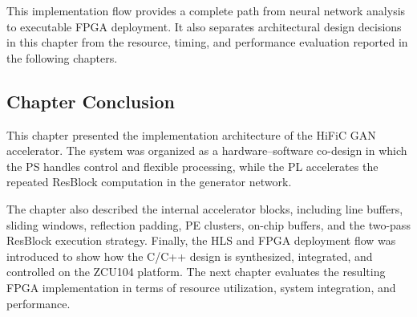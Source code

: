 This implementation flow provides a complete path from neural network analysis to executable FPGA deployment. It also separates architectural design decisions in this chapter from the resource, timing, and performance evaluation reported in the following chapters.

\subsection{Chapter Conclusion}

This chapter presented the implementation architecture of the HiFiC GAN accelerator. The system was organized as a hardware--software co-design in which the PS handles control and flexible processing, while the PL accelerates the repeated ResBlock computation in the generator network.

The chapter also described the internal accelerator blocks, including line buffers, sliding windows, reflection padding, PE clusters, on-chip buffers, and the two-pass ResBlock execution strategy. Finally, the HLS and FPGA deployment flow was introduced to show how the C/C++ design is synthesized, integrated, and controlled on the ZCU104 platform. The next chapter evaluates the resulting FPGA implementation in terms of resource utilization, system integration, and performance.